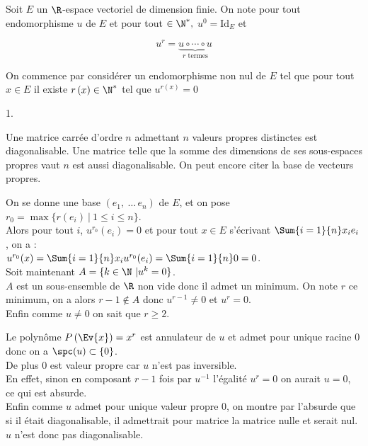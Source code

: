 \documentclass[11pt]{article}%
\begin{document}
 \begin{exercice} \indent \\
\\
 Soit $E$ un $\R$-espace vectoriel de dimension finie. On note pour
 tout endomorphisme $u$ de $E$ et pour tout $\in \N^*,$ $u^{0} =
\mathrm{Id}_{E}$ et 
 
\[
 u^{r} = \underset{r\text{ termes}}{\underbrace{u\circ \cdots \circ u}}
\]

 \noindent On commence par considérer un endomorphisme non nul de $E$
tel que pour
 tout $x\in E$ il existe $r\left( x\right) \in \N^*$ tel que $
u^{r\left( x\right) } = 0$

 \begin{noliste}{1.}
 \setlength{\itemsep}{4mm}
 \item Une matrice carrée d'ordre $n$ admettant $n$ valeurs propres
distinctes est diagonalisable. Une matrice telle que la somme des
dimensions de ses sous-espaces propres vaut $n$ est aussi
diagonalisable. On peut encore citer la base de vecteurs propres. \\

 \item On se donne une base $(e_{1},\ \dots\, e_{n})$ de $E$, et on
pose $r_{0} = \max \{ r( e_{i})\ |\ 1 \leq i \leq n \}$. \\
 Alors pour tout $i$, $u^{r_{0}} (e_{i}) = 0$ et pour tout $x \in E$
s'écrivant $\Sum{i = 1}{n} x_{i} e_{i}$, on a : \\
 $u^{r_{0}} (x) = \Sum{i = 1}{n} x_{i} u^{r_{0}} (e_{i}) = \Sum{i =
1}{n} 0 = 0$. \\
 Soit maintenant $A = \{ k \in \N\ | u^{k} = 0 \}$. \\
 $A$ est un sous-ensemble de $\R$ non vide donc il admet un minimum. On
note $r$ ce minimum, on a alors $r-1 \notin A$ donc $u^{r-1} \neq 0$ et
$u^{r} = 0$. \\
 Enfin comme $u \neq 0$ on sait que $r \geq 2$. \\

 \item Le polynôme $P\left(\Ev{x}\right) = x^{r}$ est annulateur de $u$
et admet pour unique racine 0 donc on a $\spc (u) \subset \{ 0 \}$. \\
 De plus 0 est valeur propre car $u$ n'est pas inversible. \\
 En effet, sinon en composant $r-1$ fois par $u^{-1}$ l'égalité $u^{r}
= 0$ on aurait $u = 0$, ce qui est absurde. \\
 Enfin comme $u$ admet pour unique valeur propre 0, on montre par
l'absurde que si il était diagonalisable, il admettrait pour matrice la
matrice nulle et serait nul. $u$ n'est donc pas diagonalisable. \\


\end{noliste}
\end{exercice}
\end{document}
